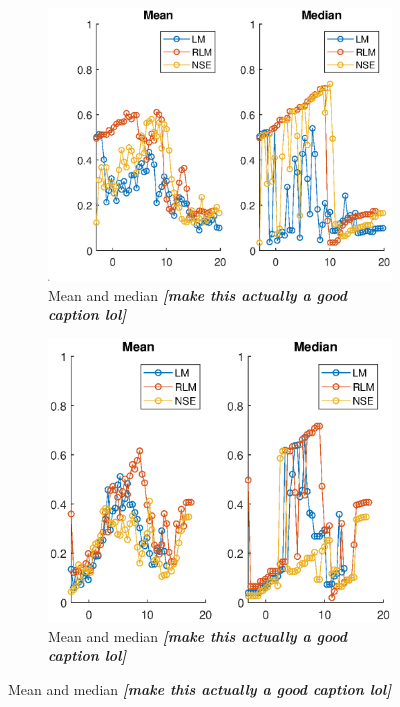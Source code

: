 \begin{figure}[ht]
\begin{subfigure}{0.50\linewidth}
\centering
\includegraphics[scale=0.6]{figures/flight_results/coop_great_mean_median.eps}
\caption{Mean and median \textit{\textbf{[make this actually a good caption lol]}}}
\label{fig:flightCoopGreatMeanMed}
\end{subfigure}%
\begin{subfigure}{0.50\linewidth}
\centering
\includegraphics[scale=0.6]{figures/flight_results/Coop_good_mean_median.eps}
\caption{Mean and median \textit{\textbf{[make this actually a good caption lol]}}}

\end{subfigure}
\end{figure}
